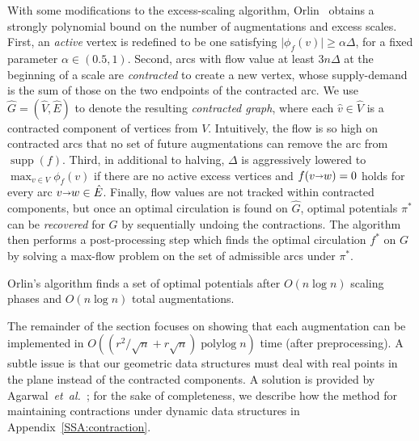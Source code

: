 \documentclass[a4paper,UKenglish]{socg-lipics-v2018}
\def\etal{\emph{et~al.}}
\def\etal{\textit{et~al.}}
\def\polylog{\mathop{\mathrm{polylog}}}
\def\abs#1{\mathopen| #1 \mathclose|}		%
\def\fsupply{\phi}
\def\arcto{\mathord\shortrightarrow}
\def\arc#1#2{#1\arcto#2}
\def\supp{\operatorname{supp}}
\theoremstyle{plain}
\numberwithin{figure}{section}
\def\EMPH#1{\textcolor{BrickRed}{{\emph{#1}}}}
\begin{document}
\begin{toappendix}
With some modifications to the excess-scaling algorithm, Orlin~\cite{O93}
obtains a strongly polynomial bound on the number of
augmentations and excess scales.
First, an \EMPH{active} vertex is redefined to be one satisfying
$\abs{\fsupply_f(v)} \geq \alpha\Delta$, for a fixed parameter $\alpha \in (0.5, 1)$.
Second, arcs with flow value at least $3n\Delta$ at the beginning of a scale
are \EMPH{contracted} to create a new vertex, whose supply-demand is
the sum of those on the two endpoints of the contracted arc.
We use $\hat{G} = (\hat{V}, \hat{E})$ to denote the resulting
\EMPH{contracted graph}, where each $\hat{v} \in \hat{V}$ is a contracted
component of vertices from $V$.
Intuitively, the flow is so high on contracted arcs that no set of future
augmentations can remove the arc from $\supp(f)$.
Third, in additional to halving, $\Delta$ is aggressively lowered to $\max_{v \in V} \fsupply_f(v)$ if there are no
active excess vertices and $f(\arc vw) = 0$ holds for every arc $\arc vw \in \hat{E}$.
Finally, flow values are not tracked within contracted components, but once an
optimal circulation is found on $\hat{G}$, optimal potentials $\pi^*$ can be
\EMPH{recovered} for $G$ by sequentially undoing the contractions.
The algorithm then performs a post-processing step which finds the optimal
circulation $f^*$ on $G$ by solving a max-flow problem on the set of admissible
arcs under $\pi^*$.

\end{toappendix}

\begin{theorem}
\label{theorem:orlin_old}
Orlin's algorithm finds a set of optimal potentials after $O(n\log n)$ scaling phases
and $O(n\log n)$ total augmentations.
\end{theorem}

The remainder of the section focuses on showing that each augmentation can be
implemented in $O((r^2/\sqrt{n}+r\sqrt{n})\polylog n)$ time (after preprocessing).
%
A subtle issue is that our geometric data structures must deal with real points
in the plane instead of the contracted components.
A solution is provided by Agarwal~\etal~\cite{AFPVX17};
for the sake of completeness, we describe how the method for maintaining
contractions under dynamic data structures in Appendix~\ref{SSA:contraction}.
\end{document}
